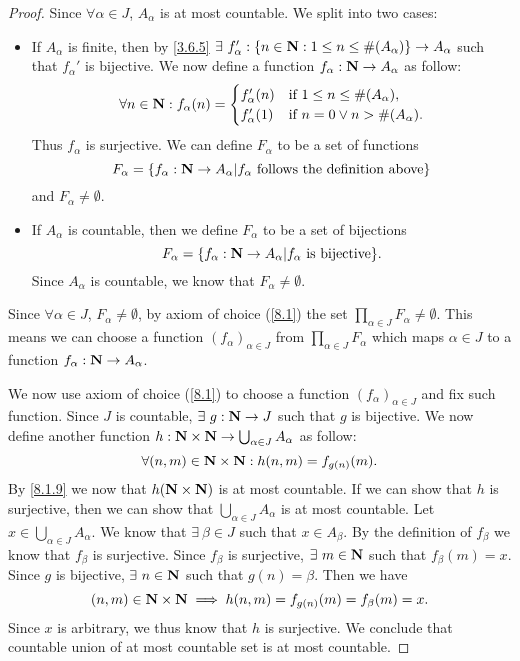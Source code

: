 \begin{proof}
  Since \(\forall \alpha \in J\), \(A_{\alpha}\) is at most countable.
  We split into two cases:
  \begin{itemize}
    \item If \(A_{\alpha}\) is finite, then by \cref{3.6.5} \(\exists\ f_{\alpha}' : \{n \in \N : 1 \leq n \leq \#(A_{\alpha})\} \to A_{\alpha}\) such that \(f_{\alpha}'\) is bijective.
          We now define a function \(f_{\alpha} : \mathbf{N} \to A_{\alpha}\) as follow:
          \[
            \forall n \in \mathbf{N} : f_{\alpha}(n) = \begin{cases}
              f_{\alpha}'(n) & \text{if } 1 \leq n \leq \#(A_{\alpha}),  \\
              f_{\alpha}'(1) & \text{if } n = 0 \lor n > \#(A_{\alpha}).
            \end{cases}
          \]
          Thus \(f_{\alpha}\) is surjective.
          We can define \(F_{\alpha}\) to be a set of functions
          \[
            F_{\alpha} = \{f_{\alpha} : \mathbf{N} \to A_{\alpha} | f_{\alpha} \text{ follows the definition above}\}
          \]
          and \(F_{\alpha} \neq \emptyset\).
    \item If \(A_{\alpha}\) is countable, then we define \(F_{\alpha}\) to be a set of bijections
          \[
            F_{\alpha} = \{f_{\alpha} : \mathbf{N} \to A_{\alpha} | f_{\alpha} \text{ is bijective}\}.
          \]
          Since \(A_{\alpha}\) is countable, we know that \(F_{\alpha} \neq \emptyset\).
  \end{itemize}
  Since \(\forall \alpha \in J\), \(F_{\alpha} \neq \emptyset\), by axiom of choice (\cref{8.1}) the set \(\prod_{\alpha \in J} F_{\alpha} \neq \emptyset\).
  This means we can choose a function \((f_{\alpha})_{\alpha \in J}\) from \(\prod_{\alpha \in J} F_{\alpha}\) which maps \(\alpha \in J\) to a function \(f_{\alpha} : \mathbf{N} \to A_{\alpha}\).

  We now use axiom of choice (\cref{8.1}) to choose a function \((f_{\alpha})_{\alpha \in J}\) and fix such function.
  Since \(J\) is countable, \(\exists\ g : \mathbf{N} \to J\) such that \(g\) is bijective.
  We now define another function \(h : \mathbf{N} \times \mathbf{N} \to \bigcup_{\alpha \in J} A_{\alpha}\) as follow:
  \[
    \forall (n, m) \in \mathbf{N} \times \mathbf{N} : h(n, m) = f_{g(n)}(m).
  \]
  By \cref{8.1.9} we now that \(h(\mathbf{N} \times \mathbf{N})\) is at most countable.
  If we can show that \(h\) is surjective, then we can show that \(\bigcup_{\alpha \in J} A_{\alpha}\) is at most countable.
  Let \(x \in \bigcup_{\alpha \in J} A_{\alpha}\).
  We know that \(\exists\ \beta \in J\) such that \(x \in A_{\beta}\).
  By the definition of \(f_{\beta}\) we know that \(f_{\beta}\) is surjective.
  Since \(f_{\beta}\) is surjective, \(\exists\ m \in \mathbf{N}\) such that \(f_{\beta}(m) = x\).
  Since \(g\) is bijective, \(\exists\ n \in \mathbf{N}\) such that \(g(n) = \beta\).
  Then we have
  \[
    (n, m) \in \mathbf{N} \times \mathbf{N} \implies h(n, m) = f_{g(n)}(m) = f_{\beta}(m) = x.
  \]
  Since \(x\) is arbitrary, we thus know that \(h\) is surjective.
  We conclude that countable union of at most countable set is at most countable.


\end{proof}

